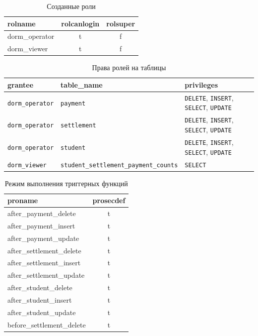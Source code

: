 \begin{table}[H]
\centering
\caption{Созданные роли}
\label{tab:check_roles}
\small
\begin{tabular}{|l|c|c|}
\hline
\textbf{rolname} & \textbf{rolcanlogin} & \textbf{rolsuper} \\ \hline
dorm\_operator & t & f \\ \hline
dorm\_viewer & t & f \\ \hline
\end{tabular}
\end{table}

\begin{table}[H]
\centering
\caption{Права ролей на таблицы}
\label{tab:check_grants}
\small
\begin{tabularx}{\textwidth}{|>{\raggedright\arraybackslash}p{2.8cm}|>{\raggedright\arraybackslash}X|>{\raggedright\arraybackslash}p{4.2cm}|}
\hline
\textbf{grantee} & \textbf{table\_name} & \textbf{privileges} \\ \hline
\texttt{dorm\_operator} & \texttt{payment} & \texttt{DELETE}, \texttt{INSERT}, \texttt{SELECT}, \texttt{UPDATE} \\ \hline
\texttt{dorm\_operator} & \texttt{settlement} & \texttt{DELETE}, \texttt{INSERT}, \texttt{SELECT}, \texttt{UPDATE} \\ \hline
\texttt{dorm\_operator} & \texttt{student} & \texttt{DELETE}, \texttt{INSERT}, \texttt{SELECT}, \texttt{UPDATE} \\ \hline
\texttt{dorm\_viewer} & \texttt{student\_}\-\texttt{settlement\_}\-\texttt{payment\_}\-\texttt{counts} & \texttt{SELECT} \\ \hline
\end{tabularx}
\end{table}

\begin{table}[H]
\centering
\caption{Режим выполнения триггерных функций}
\label{tab:check_functions}
\small
\begin{tabular}{|l|c|}
\hline
\textbf{proname} & \textbf{prosecdef} \\ \hline
after\_payment\_delete & t \\ \hline
after\_payment\_insert & t \\ \hline
after\_payment\_update & t \\ \hline
after\_settlement\_delete & t \\ \hline
after\_settlement\_insert & t \\ \hline
after\_settlement\_update & t \\ \hline
after\_student\_delete & t \\ \hline
after\_student\_insert & t \\ \hline
after\_student\_update & t \\ \hline
before\_settlement\_delete & t \\ \hline
\end{tabular}
\end{table}

